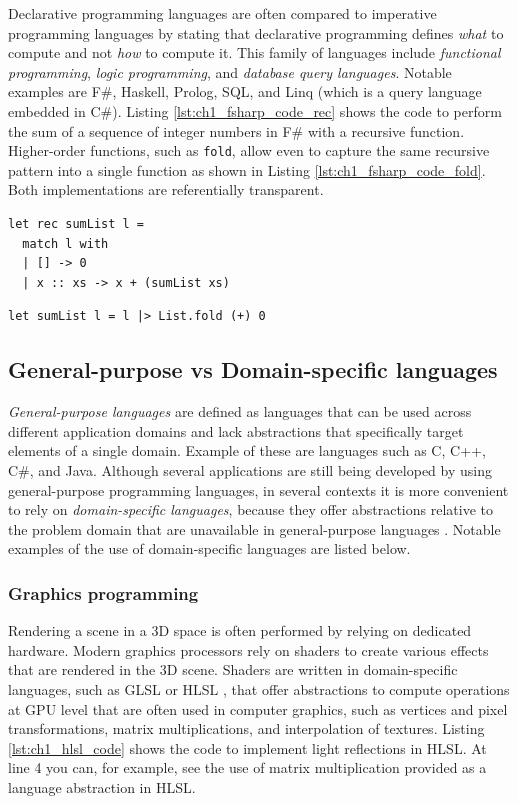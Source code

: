 Declarative programming languages are often compared to imperative programming languages by stating that declarative programming defines \textit{what} to compute and not \textit{how} to compute it. This family of languages include \textit{functional programming}, \textit{logic programming}, and \textit{database query languages}. Notable examples are F\#, Haskell, Prolog, SQL, and Linq (which is a query language embedded in C\#). Listing \ref{lst:ch1_fsharp_code_rec} shows the code to perform the sum of a sequence of integer numbers in F\# with a recursive function. Higher-order functions, such as \texttt{fold}, allow even to capture the same recursive pattern into a single function as shown in Listing \ref{lst:ch1_fsharp_code_fold}. Both implementations are referentially transparent.

\begin{lstlisting}[caption = Recursive F\# code to compute the sum of a sequence of numbers, label = lst:ch1_fsharp_code_rec]
let rec sumList l =
  match l with
  | [] -> 0
  | x :: xs -> x + (sumList xs)
\end{lstlisting}

\begin{lstlisting}[caption = F\# code to compute the sum of a sequence of numbers using higher-order functions, label = lst:ch1_fsharp_code_fold]
let sumList l = l |> List.fold (+) 0
\end{lstlisting}

\subsection{General-purpose vs Domain-specific languages}
\label{sec:ch1_dsl}
\textit{General-purpose languages} are defined as languages that can be used across different application domains and lack abstractions that specifically target elements of a single domain. Example of these are languages such as C, C++, C\#, and Java. Although several applications are still being developed by using general-purpose programming languages, in several contexts it is more convenient to rely on \textit{domain-specific languages}, because they offer abstractions relative to the problem domain that are unavailable in general-purpose languages \cite{van2000domain, voelter2013dsl}. Notable examples of the use of domain-specific languages are listed below.

\subsubsection*{Graphics programming}
Rendering a scene in a 3D space is often performed by relying on dedicated hardware. Modern graphics processors rely on shaders to create various effects that are rendered in the 3D scene. Shaders are written in domain-specific languages, such as GLSL or HLSL \cite{glhl2014, hlsl2018, hlslref2018}, that offer abstractions to compute operations at GPU level that are often used in computer graphics, such as vertices and pixel transformations, matrix multiplications, and interpolation of textures. Listing \ref{lst:ch1_hlsl_code} shows the code to implement light reflections in HLSL. At line 4 you can, for example, see the use of matrix multiplication provided as a language abstraction in HLSL.

